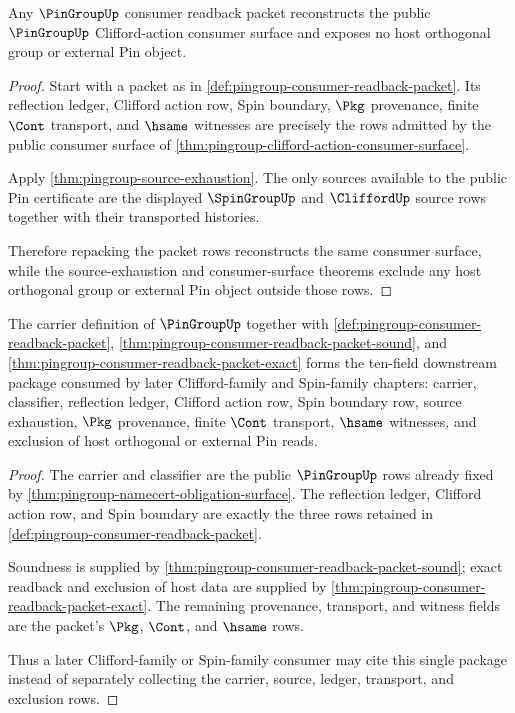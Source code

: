 \begin{theorem}
\label{thm:pingroup-consumer-readback-packet-exact}
Any $\PinGroupUp$ consumer readback packet reconstructs the public
$\PinGroupUp$ Clifford-action consumer surface and exposes no host orthogonal
group or external Pin object.
\end{theorem}
\begin{proof}
Start with a packet as in
\autoref{def:pingroup-consumer-readback-packet}. Its reflection ledger,
Clifford action row, Spin boundary, $\Pkg$ provenance, finite $\Cont$
transport, and $\hsame$ witnesses are precisely the rows admitted by the
public consumer surface of
\autoref{thm:pingroup-clifford-action-consumer-surface}.

Apply \autoref{thm:pingroup-source-exhaustion}. The only sources available to
the public Pin certificate are the displayed $\SpinGroupUp$ and $\CliffordUp$
source rows together with their transported histories.

Therefore repacking the packet rows reconstructs the same consumer surface,
while the source-exhaustion and consumer-surface theorems exclude any host
orthogonal group or external Pin object outside those rows.
\end{proof}

\begin{theorem}
\label{thm:pingroup-downstream-unblock-package}
The carrier definition of $\PinGroupUp$ together with
\autoref{def:pingroup-consumer-readback-packet},
\autoref{thm:pingroup-consumer-readback-packet-sound}, and
\autoref{thm:pingroup-consumer-readback-packet-exact} forms the ten-field
downstream package consumed by later Clifford-family and Spin-family chapters:
carrier, classifier, reflection ledger, Clifford action row, Spin boundary row,
source exhaustion, $\Pkg$ provenance, finite $\Cont$ transport, $\hsame$
witnesses, and exclusion of host orthogonal or external Pin reads.
\end{theorem}
\begin{proof}
The carrier and classifier are the public $\PinGroupUp$ rows already fixed by
\autoref{thm:pingroup-namecert-obligation-surface}. The reflection ledger,
Clifford action row, and Spin boundary are exactly the three rows retained in
\autoref{def:pingroup-consumer-readback-packet}.

Soundness is supplied by
\autoref{thm:pingroup-consumer-readback-packet-sound}; exact readback and
exclusion of host data are supplied by
\autoref{thm:pingroup-consumer-readback-packet-exact}. The remaining
provenance, transport, and witness fields are the packet's $\Pkg$, $\Cont$,
and $\hsame$ rows.

Thus a later Clifford-family or Spin-family consumer may cite this single
package instead of separately collecting the carrier, source, ledger,
transport, and exclusion rows.
\end{proof}

